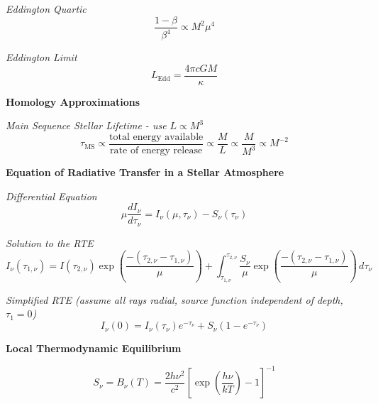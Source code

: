\documentclass{article}
\begin{document}
\textit{Eddington Quartic}
\begin{equation}
\frac{1 - \beta}{\beta^4} \propto M^2 \mu^4
\end{equation}

\textit{Eddington Limit}
\begin{equation}
L_\mathrm{Edd} = \frac{4 \pi c G M}{\kappa}
\end{equation}

\textbf {Homology Approximations}

\textit{Main Sequence Stellar Lifetime - use \( L \propto M^3 \)}
\begin{equation}
\tau_\mathrm{MS} \propto \frac{\text{total energy available}}{\text{rate of energy release}} \propto \frac{M}{L} \propto  \frac{M}{M^3} \propto M^{-2}
\end{equation}


\textbf {Equation of Radiative Transfer in a Stellar Atmosphere}

\textit{Differential Equation}
\begin{equation}
\mu \frac{dI_\nu}{d\tau_\nu} = I_\nu (\mu, \tau_\nu) - S_\nu (\tau_\nu)
\end{equation}

\textit{Solution to the RTE}
\begin{equation}
I_\nu(\tau_{1, \nu}) = I(\tau_{2, \nu}) \exp \left( \frac{-(\tau_{2, \nu} - \tau_{1, \nu})}{\mu} \right) + \int_{\tau_{1, \nu}}^{\tau_{2, \nu}} \frac{S_\nu}{\mu} \exp \left( \frac{-(\tau_{2, \nu} - \tau_{1, \nu})}{\mu} \right)  \,d\tau_\nu
\end{equation}

\textit{Simplified RTE (assume all rays radial, source function independent of depth, \(\tau_1 = 0\))}
\begin{equation}
I_\nu(0) = I_\nu (\tau_\nu) e^{-\tau_\nu} + S_\nu (1 - e^ {-\tau_\nu})
\end{equation}


\textbf {Local Thermodynamic Equilibrium}


\begin{equation}
S_\nu = B_\nu(T) = \frac{2 h \nu^2}{c^2} \left[ \exp \left( \frac{h \nu}{kT}  \right) -1 \right]^{-1}
\end{equation}
\end{document}
